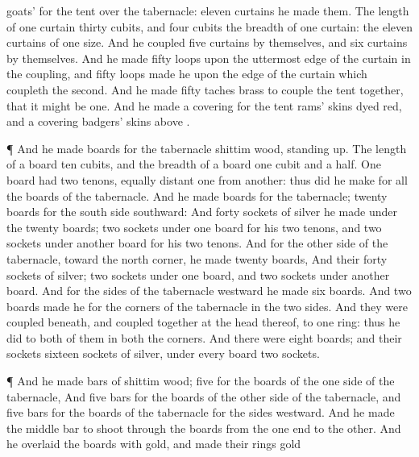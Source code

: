 {{}
goats’
{} for the
tent over the
tabernacle:
eleven
curtains he
made them.
The
length of
one
curtain
{}
thirty
cubits, and
four
cubits
{} the
breadth of
one
curtain: the
eleven
curtains
{} of
one
size.
And he
coupled
five
curtains by themselves, and
six
curtains by themselves.
And he
made
fifty
loops upon the
uttermost
edge of the
curtain in the
coupling, and
fifty
loops
made he upon the
edge of the
curtain which
coupleth the
second.
And he
made
fifty
taches
{}
brass to
couple the
tent
together, that it might be
one.
And he
made a
covering for the
tent
{}
rams’
skins dyed
red, and a
covering
{}
badgers’
skins
above
{}.
\par }{\PP {}¶ And he
made
boards for the
tabernacle
{}
shittim
wood, standing
up.
The
length of a
board
{}
ten
cubits, and the
breadth of a
board
one
cubit and a
half.
One
board had
two
tenons, equally
distant
one
from
another: thus did he
make for all the
boards of the
tabernacle.
And he
made
boards for the
tabernacle;
twenty
boards for the
south
side
southward:
And
forty
sockets of
silver he
made under the
twenty
boards;
two
sockets under
one
board for his
two
tenons, and
two
sockets under
another
board for his
two
tenons.
And for the
other
side of the
tabernacle,
{} toward the
north
corner, he
made
twenty
boards,
And their
forty
sockets of
silver;
two
sockets under
one
board, and
two
sockets under
another
board.
And for the
sides of the
tabernacle
westward he
made
six
boards.
And
two
boards
made he for the
corners of the
tabernacle in the two
sides.
And they were
coupled
beneath, and
coupled
together at the
head thereof, to
one
ring: thus he
did to
both of them in
both the
corners.
And there were
eight
boards; and their
sockets
{}
sixteen
sockets of
silver, under
every
board
two
sockets.
\par }{\PP {}¶ And he
made
bars of
shittim
wood;
five for the
boards of the
one
side of the
tabernacle,
And
five
bars for the
boards of the
other
side of the
tabernacle, and
five
bars for the
boards of the
tabernacle for the
sides
westward.
And he
made the
middle
bar to
shoot
through the
boards from the one
end to the
other.
And he
overlaid the
boards with
gold, and
made their
rings
{}
gold
{}
}
